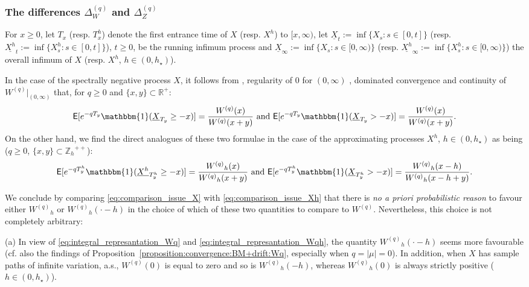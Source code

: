 \documentclass[pdftex,oneside,11pt,reqno]{amsart}
\theoremstyle{definition}
\theoremstyle{theorem}
\theoremstyle{remark}
\numberwithin{equation}{section}
\numberwithin{definition}{section}
\begin{document}
\subsubsection{The differences $\Delta_W^{(q)}$ and $\Delta_Z^{(q)}$}\label{subsubsection:precise_statement}
For $x\geq 0$, let $T_x$ (resp. $T^h_x$) denote the first entrance time of $X$ (resp. $X^h$) to $[x,\infty)$, let $\underline{X}_t:=\inf \{X_s:s\in [0,t]\}$  (resp. $\underline{X^h}_t:=\inf \{X_s^h:s\in [0,t]\}$), $t\geq 0$, be the running infimum process and $\underline{X}_{\infty}:=\inf\{X_s:s\in [0,\infty)\}$ (resp. $\underline{X^h}_\infty:=\inf\{X_s^h:s\in [0,\infty)\}$) the overall infimum of $X$ (resp. $X^h$, $h\in (0,h_\star)$). 

In the case of the spectrally negative process $X$, it follows from \cite[Theorem 8.1~(iii)]{kyprianou}, regularity of $0$ for $(0,\infty)$ \cite[p. 212]{kyprianou}, dominated convergence and continuity of ${W^{(q)}}\vert_{(0,\infty)}$ that, for $q\geq 0$ and $\{x,y\}\subset \mathbb{R}^+$: 
\begin{equation}\label{eq:comparison_issue_X}
{\mathsf E}[e^{-q T_y}\mathbbm{1}(\underline{X}_{T_y}\geq -x)]=\frac{{W^{(q)}}(x)}{{W^{(q)}}(x+y)}\text{ and }{\mathsf E}[e^{-q T_y}\mathbbm{1}(\underline{X}_{T_y}>-x)]=\frac{{W^{(q)}}(x)}{{W^{(q)}}(x+y)}.
\end{equation}
On the other hand, we find \cite[Theorem 4.6]{vidmar:fluctuation_theory} the direct analogues of these two formulae in the case of the approximating processes $X^h$, $h\in (0,h_\star)$ as being ($q\geq 0$, $\{x,y\}\subset {\mathbb{Z}_h}^{++}$):
\begin{equation}\label{eq:comparison_issue_Xh}
{\mathsf E}[e^{-q T^h_y}\mathbbm{1}(\underline{X^h}_{T_y^h}\geq -x)]=\frac{{W^{(q)}}_h(x)}{{W^{(q)}}_h(x+y)}\text{ and }{\mathsf E}[e^{-q T_y^h}\mathbbm{1}(\underline{X}_{T_y^h}>-x)]=\frac{{W^{(q)}}_h(x-h)}{{W^{(q)}}_h(x-h+y)}.
\end{equation}

We conclude by comparing \eqref{eq:comparison_issue_X} with \eqref{eq:comparison_issue_Xh} that there is \emph{no a priori probabilistic reason} to favour either ${W^{(q)}}_h$ or ${W^{(q)}}_h(\cdot-h)$ in the choice of which of these two quantities to compare to ${W^{(q)}}$. Nevertheless, this choice is not completely arbitrary:

\noindent (a) In view of \eqref{eq:integral_represantation_Wq} and \eqref{eq:integral_represantation_Wqh}, the quantity ${W^{(q)}}_h(\cdot-h)$ seems more favourable (cf. also the findings of Proposition~\ref{proposition:convergence:BM+drift:Wq}, especially when $q=\vert \mu\vert=0$). In addition, when $X$ has sample paths of infinite variation, a.s., ${W^{(q)}}(0)$ is equal to zero \cite[p. 33, Lemma 3.1]{kuznetsovkyprianourivero} and so is ${W^{(q)}}_h(-h)$, whereas ${W^{(q)}}_h(0)$ is always strictly positive ($h\in (0,h_\star)$). 
\end{document}
